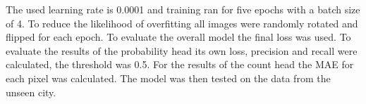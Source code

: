 The used learning rate is 0.0001 and training ran for five epochs with a batch size of 4. To reduce the likelihood of overfitting all images were randomly rotated and flipped for each epoch. To evaluate the overall model the final loss was used. To evaluate the results of the probability head its own loss, precision and recall were calculated, the threshold was 0.5. For the results of the count head the MAE for each pixel was calculated. The model was then tested on the data from the unseen city. 

